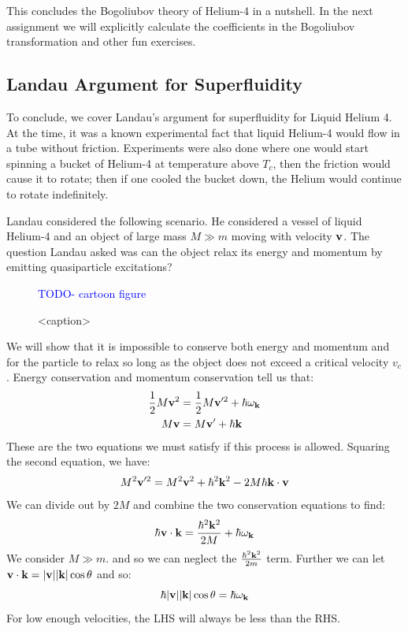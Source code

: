 This concludes the Bogoliubov theory of Helium-4 in a nutshell. In the next assignment we will explicitly calculate the coefficients in the Bogoliubov transformation and other fun exercises.

\subsection{Landau Argument for Superfluidity}
To conclude, we cover Landau's argument for superfluidity for Liquid Helium 4. At the time, it was a known experimental fact that liquid Helium-4 would flow in a tube without friction. Experiments were also done where one would start spinning a bucket of Helium-4 at temperature above $T_c$, then the friction would cause it to rotate; then if one cooled the bucket down, the Helium would continue to rotate indefinitely.

Landau considered the following scenario. He considered a vessel of liquid Helium-4 and an object of large mass $M \gg m$ moving with velocity $\mathbf{v}$. The question Landau asked was can the object relax its energy and momentum by emitting quasiparticle excitations? 

\begin{figure}[htbp]
    \centering
    \textcolor{blue}{TODO- cartoon figure}
    \caption{<caption>}
    \label{<label>}
\end{figure}

We will show that it is impossible to conserve both energy and momentum and for the particle to relax so long as the object does not exceed a critical velocity $v_c$. Energy conservation and momentum conservation tell us that:
\begin{equation}
    \begin{split}
        \frac{1}{2}M\mathbf{v}^2 &= \frac{1}{2}M\mathbf{v}'^2 + \hbar \omega_{\mathbf{k}}
        \\ M\mathbf{v} &= M\mathbf{v}' + \hbar\mathbf{k}
    \end{split}
\end{equation}
These are the two equations we must satisfy if this process is allowed.
Squaring the second equation, we have:
\begin{align*}
    M^2\mathbf{v}'^2 = M^2\mathbf{v}^2 + \hbar^2\mathbf{k}^2 - 2M\hbar \mathbf{k} \cdot \mathbf{v}
\end{align*}
We can divide out by $2M$ and combine the two conservation equations to find:
\begin{equation}
    \hbar \mathbf{v} \cdot \mathbf{k} = \frac{\hbar^2\mathbf{k}^2}{2M} + \hbar \omega_{\mathbf{k}}
\end{equation}
We consider $M \gg m$. and so we can neglect the $ \frac{\hbar^2\mathbf{k}^2}{2m}$ term. Further we can let $\mathbf{v} \cdot \mathbf{k} = \lvert \mathbf{v} \rvert\lvert \mathbf{k} \rvert\cos\theta$ and so:
\begin{equation}
    \hbar \lvert \mathbf{v} \rvert\lvert \mathbf{k} \rvert\cos\theta = \hbar \omega_{\mathbf{k}}
\end{equation}
For low enough velocities, the LHS will always be less than the RHS.

